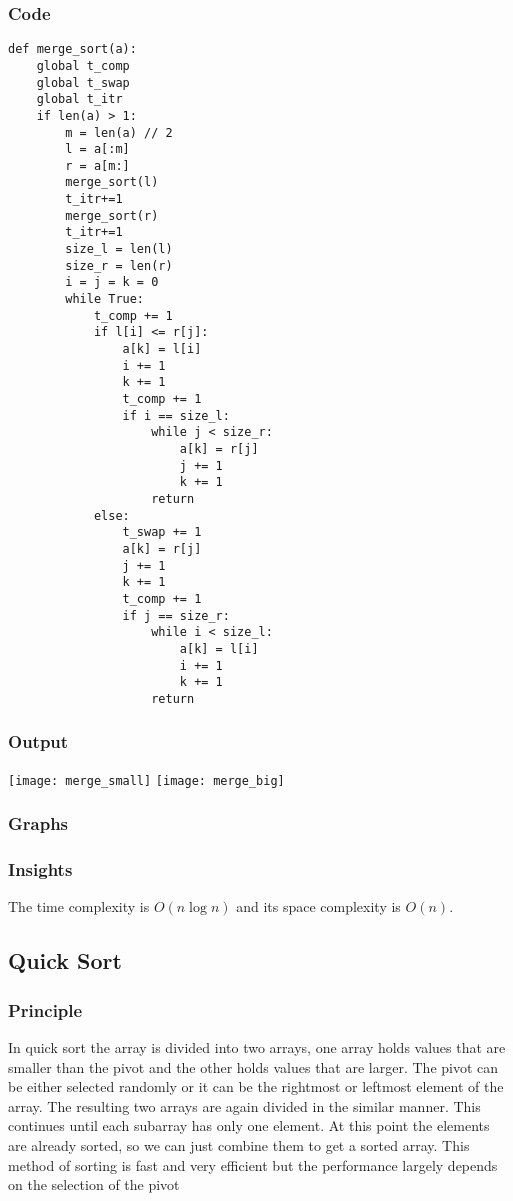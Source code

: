 \documentclass[12pt]{article}
\begin{document}
\subsubsection*{Code}
\begin{verbatim}
def merge_sort(a):
    global t_comp
    global t_swap
    global t_itr
    if len(a) > 1:
        m = len(a) // 2
        l = a[:m]
        r = a[m:]
        merge_sort(l)
        t_itr+=1
        merge_sort(r)
        t_itr+=1
        size_l = len(l)
        size_r = len(r)
        i = j = k = 0
        while True:
            t_comp += 1
            if l[i] <= r[j]:
                a[k] = l[i]
                i += 1
                k += 1
                t_comp += 1
                if i == size_l:
                    while j < size_r:
                        a[k] = r[j]
                        j += 1
                        k += 1
                    return
            else:
                t_swap += 1
                a[k] = r[j]
                j += 1
                k += 1
                t_comp += 1
                if j == size_r:
                    while i < size_l:
                        a[k] = l[i]
                        i += 1
                        k += 1
                    return
\end{verbatim}
\subsubsection*{Output}
\texttt{[image: merge\_small]}
\texttt{[image: merge\_big]}
\subsubsection*{Graphs}





\subsubsection*{Insights}
The time complexity is $O(n\log n)$ and its space complexity is $O(n)$.
\subsection{Quick Sort}
\subsubsection*{Principle}
In quick sort the array is divided into two arrays, one array
holds values that are smaller than the pivot and the other holds
values that are larger. The pivot can be either selected randomly
or it can be the rightmost or leftmost element of the array. The
resulting two arrays are again divided in the similar manner.
This continues until each subarray has only one element. At this
point the elements are already sorted, so we can just combine
them to get a sorted array. This method of sorting is fast and
very efficient but the performance largely depends on the
selection of the pivot
\end{document}
